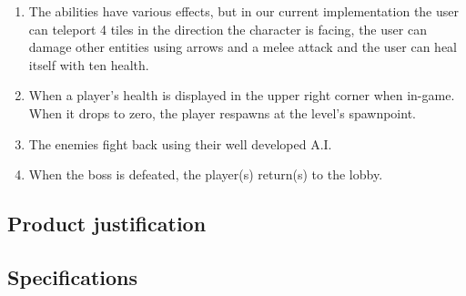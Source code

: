 \documentclass[../main.tex]{subfiles}
\begin{document}
\begin{enumerate}
		\item The abilities have various effects, but in our current implementation the user can teleport 4 tiles in the direction the character is facing, the user can damage other entities using arrows and a melee attack and the user can heal itself with ten health.
		\item When a player's health is displayed in the upper right corner when in-game. When it drops to zero, the player respawns at the level's spawnpoint.		
		\item The enemies fight back using their well developed A.I.
		\item When the boss is defeated, the player(s) return(s) to the lobby.
		
    \end{enumerate}

	\subsection{Product justification}

    \subsection{Specifications}
\end{document}
